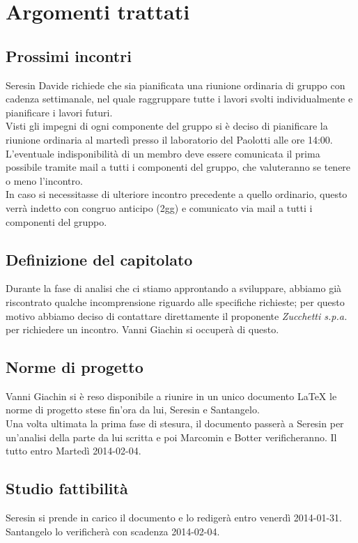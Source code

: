 \section{Argomenti trattati}
\subsection{Prossimi incontri}
Seresin Davide richiede che sia pianificata una riunione ordinaria di gruppo con cadenza settimanale, nel quale raggruppare tutte i lavori svolti individualmente e pianificare i lavori futuri.\\
Visti gli impegni di ogni componente del gruppo si è deciso di pianificare la riunione ordinaria al martedì presso il laboratorio del Paolotti alle ore 14:00.\\
L'eventuale indisponibilità di un membro deve essere comunicata il prima possibile tramite mail a tutti i componenti del gruppo, che valuteranno se tenere o meno l'incontro.\\
In caso si necessitasse di ulteriore incontro precedente a quello ordinario, questo verrà indetto con congruo anticipo (2gg) e comunicato via mail a tutti i componenti del gruppo.\\
\subsection{Definizione del capitolato}
Durante la fase di analisi che ci stiamo approntando a sviluppare, abbiamo già riscontrato qualche incomprensione riguardo alle specifiche richieste; per questo motivo abbiamo deciso di contattare direttamente il proponente \emph{Zucchetti s.p.a.} per richiedere un incontro. Vanni Giachin si occuperà di questo.\\
\subsection{Norme di progetto}
Vanni Giachin si è reso disponibile a riunire in un unico documento \LaTeX{} le norme di progetto stese fin'ora da lui, Seresin e Santangelo.\\
Una volta ultimata la prima fase di stesura, il documento passerà a Seresin per un'analisi della parte da lui scritta e poi Marcomin e Botter verificheranno. Il tutto entro Martedì 2014-02-04.
\subsection{Studio fattibilità}
Seresin si prende in carico il documento e lo redigerà entro venerdì 2014-01-31.\\
Santangelo lo verificherà con scadenza 2014-02-04.\\
